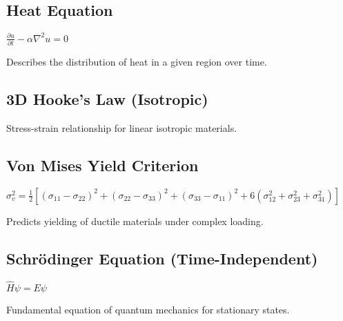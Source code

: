 \subsection{Heat Equation}
\begin{formulabox}
    $\frac{\partial u}{\partial t} - \alpha \nabla^2 u = 0$
\end{formulabox}
Describes the distribution of heat in a given region over time.


\subsection{3D Hooke's Law (Isotropic)}
\begin{formulabox}
\end{formulabox}
Stress-strain relationship for linear isotropic materials.


\subsection{Von Mises Yield Criterion}
\begin{formulabox}
    $\sigma_v^2 = \frac{1}{2} [(\sigma_{11}-\sigma_{22})^2 + (\sigma_{22}-\sigma_{33})^2 + (\sigma_{33}-\sigma_{11})^2 + 6(\sigma_{12}^2 + \sigma_{23}^2 + \sigma_{31}^2)]$
\end{formulabox}
Predicts yielding of ductile materials under complex loading.


\subsection{Schrödinger Equation (Time-Independent)}
\begin{formulabox}
    $\hat{H}\psi = E\psi$
\end{formulabox}
Fundamental equation of quantum mechanics for stationary states.

\endgroup

